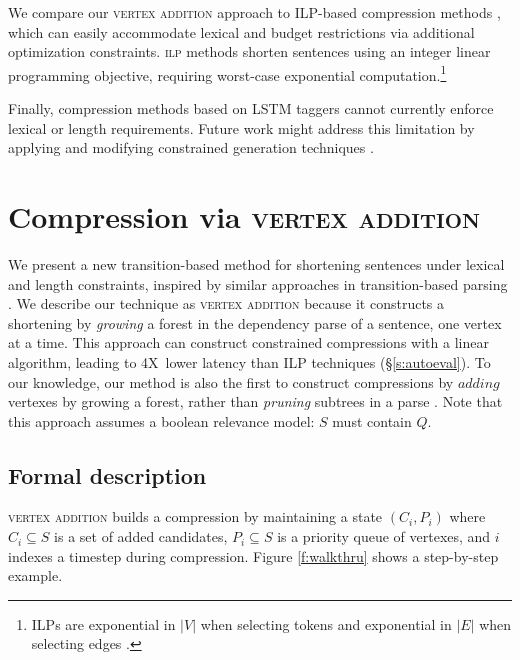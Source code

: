 \documentclass[11pt,a4paper]{article}
\newcommand{\speedup}[0]{4X~}
\begin{document}
We compare our \textsc{vertex addition} approach to ILP-based compression methods \cite{clarke2008global,filippova2013overcoming,Wang2017CanSH}, which can easily accommodate lexical and budget restrictions via additional optimization constraints. \textsc{ilp} methods shorten sentences using an integer linear programming objective, requiring worst-case exponential computation.\footnote{ILPs are exponential in $|V|$ when selecting \cite{clarke2008global} tokens and exponential in $|E|$ when selecting edges \cite{filippova2015sentence}.} 

Finally, compression methods based on LSTM taggers \cite{filippova2015sentence} cannot currently enforce lexical or length requirements. Future work might address this limitation by applying and modifying constrained generation techniques \cite{D16-1140,N18-1119,D18-1443}.

\section{Compression via \textsc{vertex addition}}\label{s:system}

We present a new transition-based method for shortening sentences under lexical and length constraints, inspired by similar approaches in transition-based parsing \cite{nivre2003}. We describe our technique as \textsc{vertex addition} because it constructs a shortening by \textit{growing} a forest in the dependency parse of a sentence, one vertex at a time. This approach can construct constrained compressions with a linear algorithm, leading to \speedup lower latency than ILP techniques (\S\ref{s:autoeval}). To our knowledge, our method is also the first to construct compressions by $\textit{adding}$ vertexes by growing a forest, rather than \textit{pruning} subtrees in a parse \cite{Knight2000StatisticsBasedS,berg2011jointly,almeida2013fast,Filippova2015FastKS}. Note that this approach assumes a boolean relevance model: $S$ must contain $Q$. 

\subsection{Formal description}\label{s:formal}

\textsc{vertex addition} builds a compression by maintaining a state
$(C_i,P_i)$ where $C_i \subseteq S$ is a set of added candidates, $P_i  \subseteq S$ is a priority queue of vertexes, and $i$ indexes a timestep during compression. Figure \ref{f:walkthru} shows a step-by-step example. 
\end{document}
